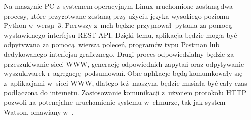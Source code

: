 Na maszynie PC z~systemem operacyjnym Linux uruchomione zostaną dwa procesy, które przygotwane zostaną przy użyciu języka wysokiego poziomu Python w~wersji~3. Pierwszy z~nich będzie przyjmował pytania za pomocą wystawionego interfejsu REST API. Dzięki temu, aplikacja będzie mogła być odpytywana za pomocą wiersza poleceń, programów typu Postman lub dedykowanego interfejsu graficznego. Drugi proces odpowiedzialny będzie za przeszukiwanie sieci WWW, generację odpowiednich zapytań oraz odpytywanie wyszukiwarek i~agregację podsumowań. Obie aplikacje będą komunikowały się z~aplikacjami w~sieci WWW, dlatego też maszyna będzie musiała być cały czas podłączona do internetu. Zastosowanie komunikacji z~użyciem protokołu HTTP pozwoli na potencjalne uruchomienie systemu w~chmurze, tak jak system Watson, omawiany w~\cite{lapshin2012question}.